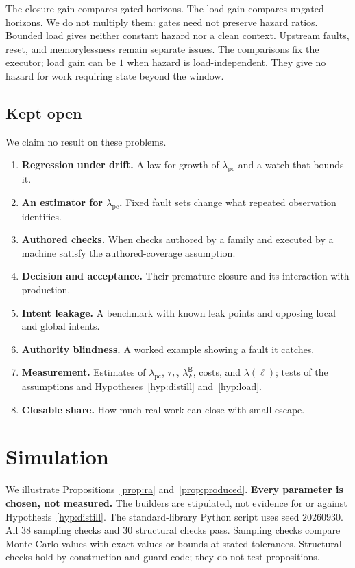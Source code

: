 \documentclass[11pt]{article}
\theoremstyle{definition}
\theoremstyle{remark}
\newcommand{\lpc}{\lambda_{\mathrm{pc}}}
\newcommand{\Bld}{\mathsf{B}}
\newcommand{\lFB}{\lambda_F^{\Bld}}
\begin{document}
The closure gain compares gated horizons. The load gain compares ungated horizons.
We do not multiply them: gates need not preserve hazard ratios.
Bounded load gives neither constant hazard nor a clean context.
Upstream faults, reset, and memorylessness remain separate issues.
The comparisons fix the executor; load gain can be $1$ when hazard is load-independent.
They give no hazard for work requiring state beyond the window.

\subsection{Kept open}\label{sec:open}
We claim no result on these problems.
\begin{enumerate}[leftmargin=1.6em,itemsep=2pt]
\item \textbf{Regression under drift.} A law for growth of $\lpc$ and a watch that bounds it.
\item \textbf{An estimator for $\lpc$.} Fixed fault sets change what repeated observation identifies.
\item \textbf{Authored checks.} When checks authored by a family and executed by a machine satisfy
the authored-coverage assumption.
\item \textbf{Decision and acceptance.} Their premature closure and its interaction with production.
\item \textbf{Intent leakage.} A benchmark with known leak points and opposing local and global intents.
\item \textbf{Authority blindness.} A worked example showing a fault it catches.
\item \textbf{Measurement.} Estimates of $\lpc$, $\tau_F$, $\lFB$, costs, and $\lambda(\ell)$;
tests of the assumptions and Hypotheses~\ref{hyp:distill} and~\ref{hyp:load}.
\item \textbf{Closable share.} How much real work can close with small escape.
\end{enumerate}

\section{Simulation}\label{sec:sim}
We illustrate Propositions~\ref{prop:ra} and~\ref{prop:produced}.
\textbf{Every parameter is chosen, not measured.}
The builders are stipulated, not evidence for or against Hypothesis~\ref{hyp:distill}.
The standard-library Python script uses seed $20260930$.
All $38$ sampling checks and $30$ structural checks pass.
Sampling checks compare Monte-Carlo values with exact values or bounds at stated tolerances.
Structural checks hold by construction and guard code; they do not test propositions.
\end{document}
